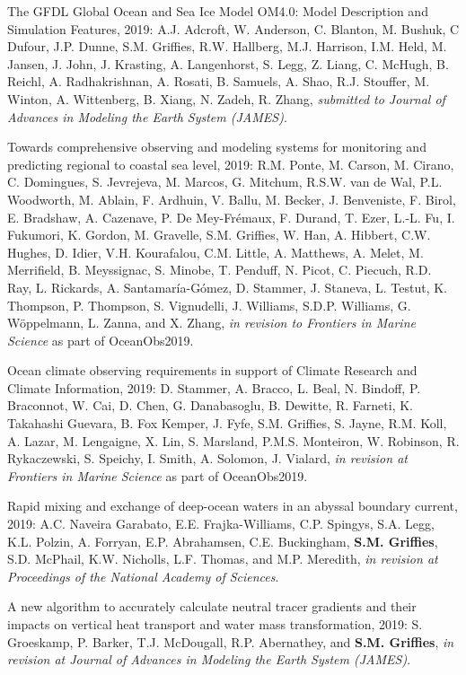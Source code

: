 \begin{etaremune}
\item The GFDL Global Ocean and Sea Ice Model OM4.0: Model Description and Simulation Features, 2019: A.J. Adcroft, W. Anderson, C. Blanton, M. Bushuk, C Dufour, J.P. Dunne, S.M. Grif\/f\/ies, R.W. Hallberg, M.J. Harrison, I.M. Held, M.  Jansen, J. John, J. Krasting, A. Langenhorst, S. Legg, Z. Liang, C. McHugh, B. Reichl, A. Radhakrishnan, A. Rosati, B. Samuels, A. Shao, R.J. Stouffer, M. Winton, A. Wittenberg, B. Xiang, N. Zadeh, R. Zhang, {\it submitted to Journal of Advances in Modeling the Earth System (JAMES)}.


\item Towards comprehensive observing and modeling systems for monitoring and predicting regional to coastal sea level, 2019: R.M. Ponte, M. Carson, M. Cirano, C. Domingues, S. Jevrejeva, M. Marcos, G. Mitchum, R.S.W. van de Wal, P.L. Woodworth, M. Ablain, F. Ardhuin, V. Ballu, M. Becker, J. Benveniste, F. Birol, E. Bradshaw, A. Cazenave, P. De Mey-{Fr\'{e}maux}, F. Durand, T. Ezer, L.-L. Fu, I. Fukumori, K. Gordon, M. Gravelle, S.M. Grif\/f\/ies, W. Han, A. Hibbert, C.W. Hughes, D. Idier, V.H. Kourafalou, C.M. Little, A. Matthews, A. Melet, M. Merrifield, B. Meyssignac, S. Minobe, T. Penduff, N. Picot, C. Piecuch, R.D. Ray, L. Rickards, A. Santamaría-Gómez, D. Stammer, J. Staneva, L. Testut, K. Thompson, P. Thompson, S. Vignudelli, J. Williams, S.D.P. Williams, G. {W\"{o}ppelmann}, L. Zanna, and X. Zhang, {\it in revision to Frontiers in Marine Science} as part of OceanObs2019.


\item Ocean climate observing requirements in support of Climate Research and Climate Information, 2019: D. Stammer, A. Bracco, L. Beal, N. Bindoff, P. Braconnot, W. Cai, D. Chen, G. Danabasoglu, B. Dewitte, R. Farneti, K. Takahashi Guevara, B. Fox Kemper, J. Fyfe, S.M. Griffies, S. Jayne, R.M. Koll, A. Lazar, M. Lengaigne, X. Lin, S. Marsland, P.M.S. Monteiron, W. Robinson, R. Rykaczewski, S. Speichy, I. Smith, A. Solomon, J. Vialard, {\it in revision at Frontiers in Marine Science} as part of OceanObs2019.

\item Rapid mixing and exchange of deep-ocean waters in an abyssal boundary current, 2019: A.C. Naveira Garabato, E.E. Frajka-Williams, C.P. Spingys, S.A. Legg, K.L. Polzin, A. Forryan, E.P. Abrahamsen, C.E. Buckingham, {\bf S.M. Grif\/f\/ies}, S.D. McPhail, K.W. Nicholls, L.F. Thomas, and M.P. Meredith,  {\it in revision at Proceedings of the National Academy of Sciences}.

\item A new algorithm to accurately calculate neutral tracer gradients and their impacts on vertical heat transport and water mass transformation, 2019: S. Groeskamp, P. Barker, T.J. McDougall, R.P. Abernathey, and {\bf S.M. Grif\/f\/ies}, {\it in revision at Journal of Advances in Modeling the Earth System (JAMES)}.


\end{etaremune}



